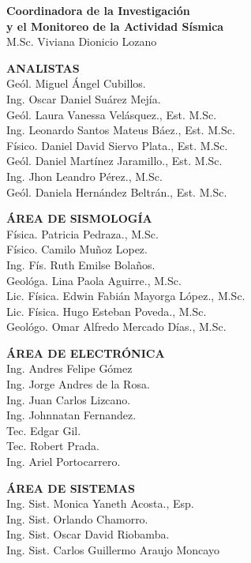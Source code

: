 \begin{multicols}{2}
\begin{flushleft}

{\bf \sffamily\textcolor{ocre}{Coordinadora  de la Investigación}} \\ 
{\bf \sffamily\textcolor{ocre}{y el Monitoreo de la Actividad Sísmica}} \\ 
M.Sc. Viviana Dionicio Lozano\\
\vspace{0.4cm}


{\bf \sffamily\textcolor{ocre}{ANALISTAS}}\\
Geól. Miguel Ángel Cubillos. \\
Ing. Oscar Daniel Suárez Mejía. \\
Geól. Laura Vanessa Velásquez., Est. M.Sc. \\
Ing. Leonardo Santos Mateus Báez., Est. M.Sc. \\
Físico. Daniel David Siervo Plata., Est. M.Sc. \\
Geól. Daniel Martínez Jaramillo., Est. M.Sc. \\
Ing. Jhon Leandro Pérez., M.Sc. \\
Geól. Daniela Hernández Beltrán., Est. M.Sc. \\
\vspace{0.4cm}

{\bf \sffamily\textcolor{ocre}{ÁREA DE SISMOLOGÍA}}\\ 
Física. Patricia Pedraza., M.Sc. \\
Físico. Camilo Muñoz Lopez. \\
Ing. Fís. Ruth Emilse Bolaños.\\
Geológa. Lina Paola Aguirre., M.Sc. \\
Lic. Física. Edwin Fabián Mayorga López., M.Sc.\\
Lic. Física. Hugo Esteban Poveda., M.Sc.\\
Geológo. Omar Alfredo Mercado Días., M.Sc.\\
\vspace{0.4cm}

{\bf \sffamily\textcolor{ocre}{ÁREA DE ELECTRÓNICA}}\\
Ing. Andres Felipe Gómez\\
Ing. Jorge Andres de la Rosa.\\
Ing. Juan Carlos Lizcano.\\
Ing. Johnnatan Fernandez.\\ 
Tec. Edgar Gil.\\
Tec. Robert Prada.\\
Ing. Ariel Portocarrero.\\
\vspace{0.4cm}

{\bf \sffamily\textcolor{ocre}{ÁREA DE SISTEMAS}}\\  
Ing. Sist. Monica Yaneth Acosta., Esp.\\
Ing. Sist. Orlando Chamorro. \\
Ing. Sist. Oscar David Riobamba. \\
Ing. Sist. Carlos Guillermo Araujo Moncayo \\
\end{flushleft}
\end{multicols}
